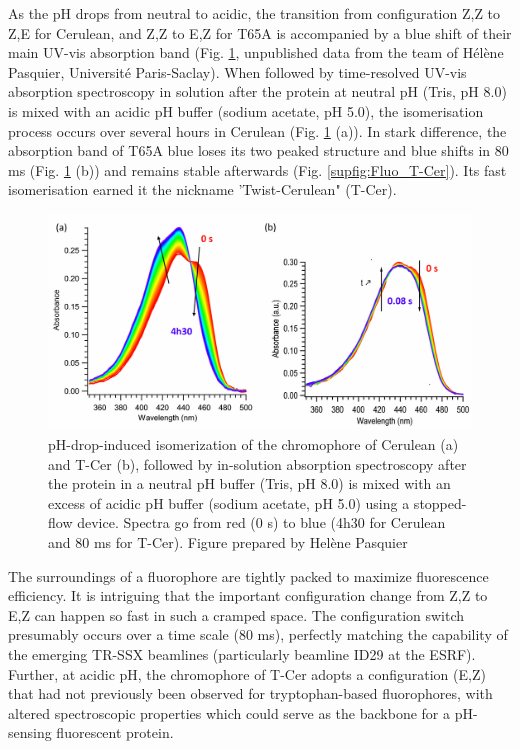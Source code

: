 As the pH drops from neutral to acidic, the transition from configuration Z,Z to Z,E for Cerulean, and Z,Z to E,Z for T65A is accompanied by a blue shift of their main UV-vis absorption band (Fig. \ref{fig:pH_TRspectroinsolution}, unpublished data from the team of Hélène Pasquier, Université Paris-Saclay).  When followed by time-resolved UV-vis absorption spectroscopy in solution after the protein at neutral pH (Tris, pH 8.0) is mixed with an acidic pH buffer (sodium acetate, pH 5.0), the isomerisation process occurs over several hours in Cerulean (Fig. \ref{fig:pH_TRspectroinsolution} (a)). In stark difference, the absorption band of T65A blue loses its two peaked structure and blue shifts in 80 ms (Fig. \ref{fig:pH_TRspectroinsolution} (b)) and remains stable afterwards (Fig. \ref{supfig:Fluo_T-Cer}). Its fast isomerisation earned it the nickname 'Twist-Cerulean" (T-Cer).
\begin{figure}[H] %
    \centering
        \noindent \includegraphics[width=\textwidth]{images/T-Cer/insolution_spectro_time.pdf}
    \hfill
    \caption{pH-drop-induced isomerization of the chromophore of Cerulean (a) and T-Cer (b), followed by in-solution absorption spectroscopy after the protein in a neutral pH buffer (Tris, pH 8.0) is mixed with an excess of acidic pH buffer (sodium acetate, pH 5.0) using a stopped-flow device. Spectra go from red (0 s) to blue (4h30 for Cerulean and 80 ms for T-Cer). Figure prepared by Helène Pasquier}
    \label{fig:pH_TRspectroinsolution}
\end{figure}
The surroundings of a fluorophore are tightly packed to maximize fluorescence efficiency. It is intriguing that the important configuration change from Z,Z to E,Z can happen so fast in such a cramped space. The configuration switch presumably occurs over a time scale (80 ms), perfectly matching the capability of the emerging TR-SSX beamlines (particularly beamline ID29 at the ESRF).  Further, at acidic pH, the chromophore of T-Cer adopts a configuration (E,Z) that had not previously been observed for tryptophan-based fluorophores, with altered spectroscopic properties which could serve as the backbone for a  pH-sensing fluorescent protein. 

